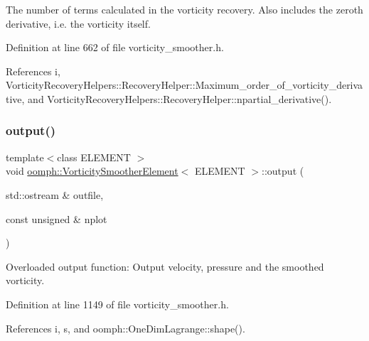 The number of terms calculated in the vorticity recovery. Also includes the zeroth derivative, i.\+e. the vorticity itself. 



Definition at line 662 of file vorticity\+\_\+smoother.\+h.



References i, Vorticity\+Recovery\+Helpers\+::\+Recovery\+Helper\+::\+Maximum\+\_\+order\+\_\+of\+\_\+vorticity\+\_\+derivative, and Vorticity\+Recovery\+Helpers\+::\+Recovery\+Helper\+::npartial\+\_\+derivative().

\mbox{\label{classoomph_1_1VorticitySmootherElement_a981931bfa4139cd4d64ed427b65c95d9}} 
\subsubsection{\texorpdfstring{output()}{output()}}
{\footnotesize\ttfamily template$<$class E\+L\+E\+M\+E\+NT $>$ \\
void \hyperlink{classoomph_1_1VorticitySmootherElement}{oomph\+::\+Vorticity\+Smoother\+Element}$<$ E\+L\+E\+M\+E\+NT $>$\+::output (\begin{DoxyParamCaption}\item[{std\+::ostream \&}]{outfile,  }\item[{const unsigned \&}]{nplot }\end{DoxyParamCaption})\hspace{0.3cm}{\ttfamily [inline]}}



Overloaded output function\+: Output velocity, pressure and the smoothed vorticity. 



Definition at line 1149 of file vorticity\+\_\+smoother.\+h.



References i, s, and oomph\+::\+One\+Dim\+Lagrange\+::shape().

\mbox{\label{classoomph_1_1VorticitySmootherElement_ac0a831db4c42647732e231bbbcbe756e}} 
